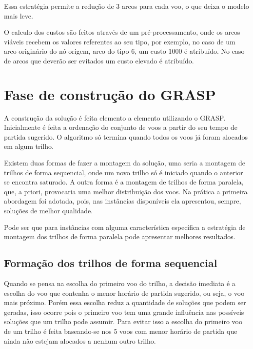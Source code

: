 Essa estratégia permite a redução de 3 arcos para cada voo, o que deixa o
modelo mais leve.

O calculo dos custos são feitos através de um pré-processamento, onde os arcos
viáveis recebem os valores referentes ao seu tipo, por exemplo, no caso de um
arco originário do nó origem, arco do tipo 6, um custo 1000 é atribuído. No
caso de arcos que deverão ser evitados um custo elevado é atribuído.
  	
  	

  
\section{Fase de construção do GRASP}\label{sessao:construcao}
  
A construção da solução é feita elemento a elemento utilizando o
GRASP. Inicialmente é feita a ordenação do conjunto de voos a partir do seu
tempo de partida sugerido. O algoritmo só termina quando todos os voos já
foram alocados em algum trilho.
  
Existem duas formas de fazer a montagem da solução, uma seria a montagem de
trilhos de forma sequencial, onde um novo trilho só é iniciado quando o anterior
se encontra saturado. A outra forma é a montagem de trilhos de forma paralela,
que, a priori, provocaria uma melhor distribuição dos voos. Na prática a
primeira abordagem foi adotada, pois, nas instâncias disponíveis ela apresentou,
sempre, soluções de melhor qualidade. 

Pode ser que para instâncias com alguma característica específica a
estratégia de montagem dos trilhos de forma paralela pode apresentar melhores
resultados.


  
\subsection{Formação dos trilhos de forma sequencial}

Quando se pensa na escolha do primeiro voo do trilho, a decisão imediata é a
escolha do voo que contenha o menor horário de partida sugerido, ou seja, o voo
mais próximo. Porém essa escolha reduz a quantidade de soluções que podem ser
geradas, isso ocorre pois o primeiro voo tem uma grande influência nas
possíveis soluções que um trilho pode assumir. Para evitar isso a escolha do
primeiro voo de um trilho é feita baseando-se nos 5 voos com menor horário de
partida que ainda não estejam alocados a nenhum outro trilho. 

